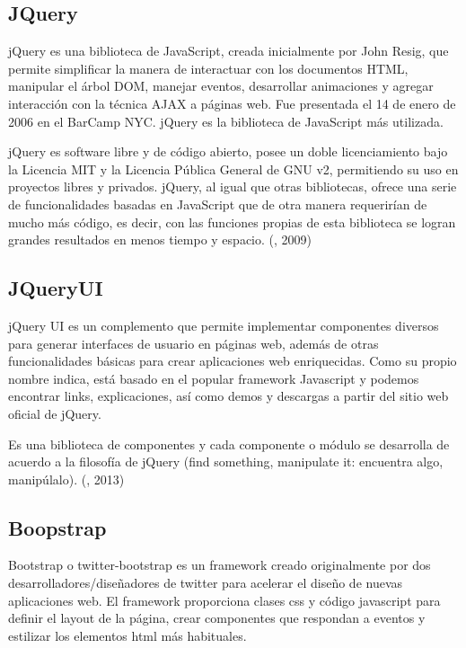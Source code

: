 \subsection{JQuery}
\setlength{\parskip}{5mm}
jQuery es una biblioteca de JavaScript, creada inicialmente por John Resig, que permite simplificar la manera de interactuar con los documentos HTML, manipular el árbol DOM, manejar eventos, desarrollar animaciones y agregar interacción con la técnica AJAX a páginas web. Fue presentada el 14 de enero de 2006 en el BarCamp NYC. jQuery es la biblioteca de JavaScript más utilizada.

jQuery es software libre y de código abierto, posee un doble licenciamiento bajo la Licencia MIT y la Licencia Pública General de GNU v2, permitiendo su uso en proyectos libres y privados. jQuery, al igual que otras bibliotecas, ofrece una serie de funcionalidades basadas en JavaScript que de otra manera requerirían de mucho más código, es decir, con las funciones propias de esta biblioteca se logran grandes resultados en menos tiempo y espacio.
\setlength{\parskip}{0mm}
(\citet{jquerybib}, 2009)

\subsection{JQueryUI}
\setlength{\parskip}{5mm}
jQuery UI es un complemento que permite implementar componentes diversos para generar interfaces de usuario en páginas web, además de otras funcionalidades básicas para crear aplicaciones web enriquecidas. Como su propio nombre indica, está basado en el popular framework Javascript y podemos encontrar links, explicaciones, así como demos y descargas a partir del sitio web oficial de jQuery.

Es una biblioteca de componentes y cada componente o módulo se desarrolla de acuerdo a la filosofía de jQuery (find something, manipulate it: encuentra algo, manipúlalo).
\setlength{\parskip}{0mm}
(\citet{jqueryuibib}, 2013)

\subsection{Boopstrap}
\setlength{\parskip}{5mm}
Bootstrap o twitter-bootstrap es un framework creado originalmente por dos desarrolladores/diseñadores de twitter para acelerar el diseño de nuevas aplicaciones web.
El framework proporciona clases css y código javascript para definir el layout de la página, crear componentes que respondan a eventos y estilizar los elementos html más habituales.

